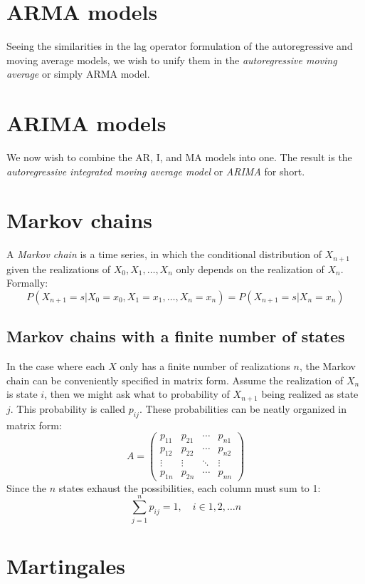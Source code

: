 \documentclass[12pt, a4paper]{article}
\numberwithin{equation}{section}
\begin{document}
\section{ARMA models}
Seeing the similarities in the lag operator formulation of the autoregressive and moving average models, we wish to unify them in the \textit{autoregressive moving average} or simply ARMA model.

\section{ARIMA models}
We now wish to combine the AR, I, and MA models into one. The result is the \textit{autoregressive integrated moving average model} or \textit{ARIMA} for short.

\section{Markov chains}
A \textit{Markov chain} is a time series, in which the conditional distribution of $X_{n+1}$ given the realizations of $X_0, X_1,\ldots, X_n$ only depends on the realization of $X_n$. Formally:
\begin{equation}
P(X_{n+1}=s|X_0=x_0, X_1=x_1,\ldots, X_n=x_n)=P(X_{n+1}=s|X_n=x_n)
\end{equation}


\subsection{Markov chains with a finite number of states}
In the case where each $X$ only has a finite number of realizations $n$, the Markov chain can be conveniently specified in matrix form. Assume the realization of $X_n$ is state $i$, then we might ask what to probability of $X_{n+1}$ being realized as state $j$. This probability is called $p_{ij}$. These probabilities can be neatly organized in matrix form:
\begin{equation}
A=\begin{pmatrix}
p_{11}	& p_{21}	& \cdots	& p_{n1} \\
p_{12}	& p_{22}	& \cdots	& p_{n2} \\
\vdots	& \vdots	& \ddots	& \vdots \\
p_{1n}	& p_{2n}	& \cdots	& p_{nn}
\end{pmatrix}
\end{equation}
Since the $n$ states exhaust the possibilities, each column must sum to 1:
\begin{equation}
\sum_{j=1}^n p_{ij}=1,\quad i\in{1,2,\ldots n}
\end{equation}

\section{Martingales}
\end{document}
